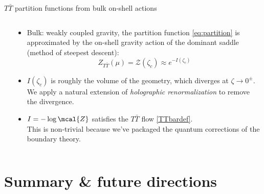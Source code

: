 \documentclass[
	10pt
	,handout
	,noamsthm
]{beamer}
\newcommand{\TTbar}{\texorpdfstring{\ensuremath{T\bar{T}}}{TTbar}\xspace}
\begin{document}
\begin{frame}{\TTbar partition functions from bulk on-shell actions}{%
	\textcite{Kraus:2021cwf,Apolo:2023vnm}
}
\begin{columns}
\begin{column}{.35\textwidth}
\figGlueon
\end{column}
\begin{column}{.65\textwidth}
\vspace{-.3\baselineskip}
\begin{itemize}
\item Bulk: weakly coupled gravity, the partition function \eqref{eq:partition} is approximated by the on-shell gravity action of the dominant saddle (method of steepest descent):
	\begin{equation}
		Z_{T\bar T} (\mu) = \mathcal Z (\zeta_c) \approx  e^{-I(\zeta_c)}\label{partition2}
	\end{equation}

\pause
\item $I(\zeta_c)$ is roughly the volume of the geometry, which diverges at $\zeta \to 0^\pm$. We apply a natural extension of \textit{holographic renormalization} to remove the divergence.

\pause
\item $I = -\log \mcal{Z}$ satisfies the \TTbar flow \eqref{TTbardef}.\\
	This is non-trivial because we've packaged the quantum corrections of the boundary theory.
\end{itemize}
\end{column}
\end{columns}
\end{frame}

\section{Summary \& future directions}
\end{document}
